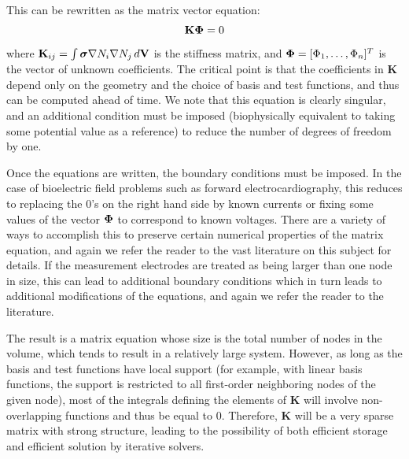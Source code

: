 \documentclass[fleqn,11pt,openany]{book}
\newcommand{\BM }[1]{\mbox{\boldmath $#1$}}
\begin{document}
This can be rewritten as the matrix vector equation:
\begin{equation} \mathbf{K} \BM{\Phi} = 0 \label{eq:mat_eq}
\end{equation}
%
\noindent where $\mathbf{K}_{ij} = \int \BM{\sigma} \nabla N_i \nabla N_j \,
d\mathbf{V}$ is the stiffness matrix, and $\BM{\Phi} = [\Phi_1,
\ldots, \Phi_n]^T$ is the vector of unknown coefficients. The critical
point is that the coefficients in $\mathbf{K}$ depend only on the geometry
and the choice of basis and test functions, and thus can be computed ahead
of time. We note that this equation is clearly singular, and an additional
condition must be imposed (biophysically equivalent to taking some
potential value as a reference) to reduce the number of degrees of freedom
by one.

Once the equations are written, the boundary conditions must be imposed. In
the case of bioelectric field problems such as forward electrocardiography,
this reduces to replacing the $0$'s on the right hand side by known
currents or fixing some values of the vector $\BM{\Phi}$ to correspond to
known voltages. There are a variety of ways to accomplish this to preserve
certain numerical properties of the matrix equation, and again we refer the
reader to the vast literature on this subject for details. If the
measurement electrodes are treated as being larger than one node in size,
this can lead to additional boundary conditions which in turn leads to
additional modifications of the equations, and again we refer the reader to
the literature.

The result is a matrix equation whose size is the total number of nodes in
the volume, which tends to result in a relatively large system. However, as
long as the basis and test functions have local support (for example, with
linear basis functions, the support is restricted to all first-order
neighboring nodes of the given node), most of the integrals defining the
elements of $\mathbf{K}$ will involve non-overlapping functions and thus be
equal to $0$. Therefore, $\mathbf{K}$ will be a very sparse matrix with
strong structure, leading to the possibility of both efficient storage and
efficient solution by iterative solvers.
\end{document}
